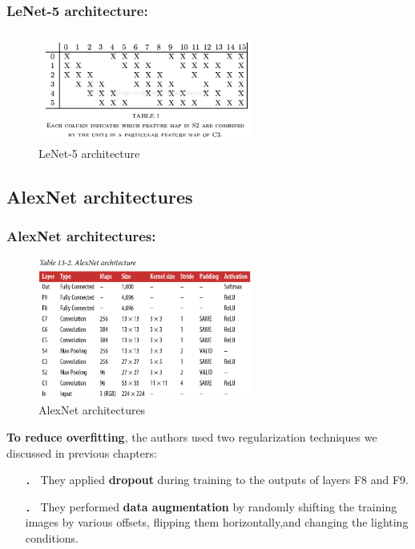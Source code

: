 \documentclass{beamer}
\begin{document}
    \begin{frame}
    \frametitle{LeNet-5 architecture: }
        \begin{figure}[H]
            \begin{center}
                \includegraphics[width=7cm]{table13-4}
            \end{center}
        \caption{LeNet-5 architecture}
        \end{figure}
    \end{frame}
\subsection{AlexNet architectures}
    \begin{frame}
    
    \end{frame}
    \begin{frame}
    \frametitle{AlexNet architectures: }
        \begin{figure}[H]
            \begin{center}
                \includegraphics[width=7cm]{table13-2}
            \end{center}
        \caption{AlexNet architectures}
        \end{figure}
    \end{frame}
    
    \begin{frame}
    \textbf{To reduce overfitting}, the authors used two regularization techniques we discussed in previous chapters:
        \begin{itemize}
            \item[．] They applied \textbf{dropout} during training to the outputs of layers F8 and F9.        
            \item[．] They performed \textbf{data augmentation} by randomly shifting the training images by various offsets, flipping them horizontally,and changing the lighting conditions.
         \end{itemize}
    \end{frame} 
    
\end{document}
